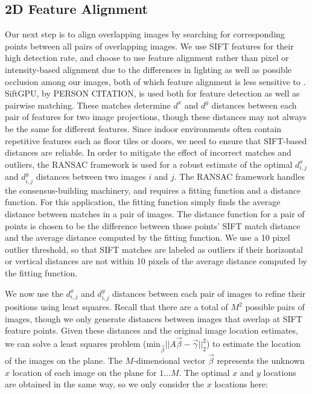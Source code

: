 \documentclass[]{spie}  %
\begin{document}
\subsection{2D Feature Alignment}
\label{sec:robustSIFTFeatureMatching}
Our next step is to align overlapping images by searching for
corresponding points between all pairs of overlapping images. We use
SIFT features for their high detection rate, and choose to use feature
alignment rather than pixel or intensity-based alignment due to the
differences in lighting as well as possible occlusion among our
images, both of which feature alignment is less sensitive to
\cite{lai1999robust, lowe1999object, mikolajczyk2005performance,
  szeliski2006image}.  SiftGPU, by PERSON CITATION, is used both for
feature detection as well as pairwise matching. These matches
determine $d^x$ and $d^y$ distances between each pair of features for
two image projections, though these distances may not always be the
same for different features. Since indoor environments often contain
repetitive features such as floor tiles or doors, we need to ensure
that SIFT-based distances are reliable. In order to mitigate the
effect of incorrect matches and outliers, the RANSAC framework
\cite{fischler1981random} is used for a robust estimate of the optimal
$d^x_{i,j}$ and $d^y_{i,j}$ distances between two images $i$ and
$j$. The RANSAC framework handles the consensus-building machinery,
and requires a fitting function and a distance function. For this
application, the fitting function simply finds the average distance
between matches in a pair of images. The distance function for a pair
of points is chosen to be the difference between those points' SIFT
match distance and the average distance computed by the fitting
function. We use a 10 pixel outlier threshold, so that SIFT matches
are labeled as outliers if their horizontal or vertical distances are
not within 10 pixels of the average distance computed by the fitting
function.

We now use the $d^x_{i,j}$ and $d^y_{i,j}$ distances between each pair
of images to refine their positions using least squares. Recall that
there are a total of $M^{2}$ possible pairs of images, though we only
generate distances between images that overlap at SIFT feature
points. Given these distances and the original image location
estimates, we can solve a least squares problem
($\textrm{min}_{\vec{\beta}} ||A \vec{\beta} - \vec{\gamma}||_2^2 $)
to estimate the location of the images on the plane. The
$M$-dimensional vector $\vec{\beta}$ represents the unknown $x$
location of each image on the plane for $1 \dots M$. The optimal $x$
and $y$ locations are obtained in the same way, so we only consider
the $x$ locations here:
\end{document}
